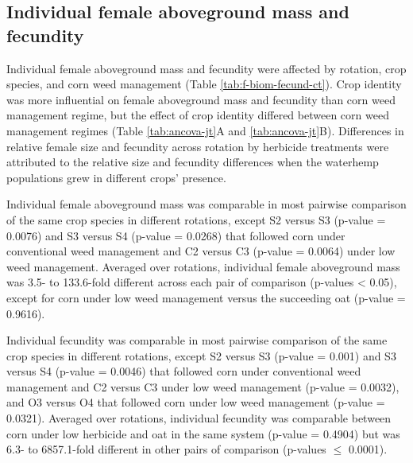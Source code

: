 \documentclass[utf8]{frontiersSCNS}
\begin{document}
\hypertarget{individual-female-aboveground-mass-and-fecundity-2}{%
\subsection*{Individual female aboveground mass and fecundity}\label{individual-female-aboveground-mass-and-fecundity-2}}

Individual female aboveground mass and fecundity were affected by rotation, crop species, and corn weed management (Table \ref{tab:f-biom-fecund-ct}). Crop identity was more influential on female aboveground mass and fecundity than corn weed management regime, but the effect of crop identity differed between corn weed management regimes (Table \ref{tab:ancova-jt}A and \ref{tab:ancova-jt}B). Differences in relative female size and fecundity across rotation by herbicide treatments were attributed to the relative size and fecundity differences when the waterhemp populations grew in different crops' presence.

Individual female aboveground mass was comparable in most pairwise comparison of the same crop species in different rotations, except S2 versus S3 (p-value = 0.0076) and S3 versus S4 (p-value = 0.0268) that followed corn under conventional weed management and C2 versus C3 (p-value = 0.0064) under low weed management. Averaged over rotations, individual female aboveground mass was 3.5- to 133.6-fold different across each pair of comparison (p-values \textless{} 0.05), except for corn under low weed management versus the succeeding oat (p-value = 0.9616).

Individual fecundity was comparable in most pairwise comparison of the same crop species in different rotations, except S2 versus S3 (p-value = 0.001) and S3 versus S4 (p-value = 0.0046) that followed corn under conventional weed management and C2 versus C3 under low weed management (p-value = 0.0032), and O3 versus O4 that followed corn under low weed management (p-value = 0.0321). Averaged over rotations, individual fecundity was comparable between corn under low herbicide and oat in the same system (p-value = 0.4904) but was 6.3- to 6857.1-fold different in other pairs of comparison (p-values \(\leq\) 0.0001).
\end{document}
